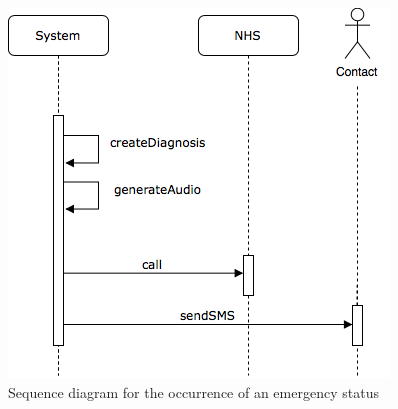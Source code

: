 \begin{figure}[H]
    \centering
    \includegraphics[scale=0.5]{./Pictures/emergency-sequence.png}
    \caption{Sequence diagram for the occurrence of an emergency status}
    
\end{figure}